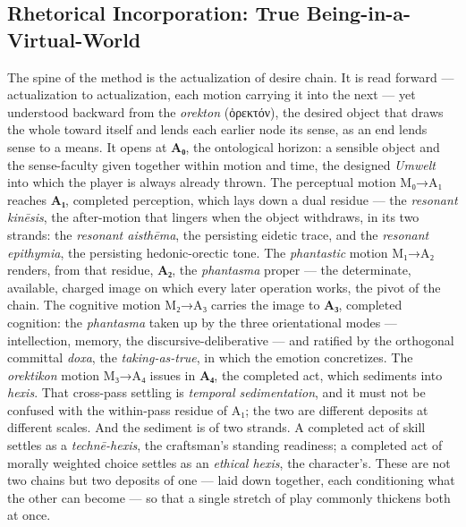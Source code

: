 \documentclass{article}
\newcommand{\gk}[1]{{\greekfont #1}}
\begin{document}
\subsection*{Rhetorical Incorporation: True Being-in-a-Virtual-World}

The spine of the method is the actualization of desire chain. It is read forward — actualization to actualization, each motion carrying it into the next — yet understood backward from the \textit{orekton} (\gk{ὀρεκτόν}), the desired object that draws the whole toward itself and lends each earlier node its sense, as an end lends sense to a means. It opens at \textbf{A₀}, the ontological horizon: a sensible object and the sense-faculty given together within motion and time, the designed \textit{Umwelt} into which the player is always already thrown. The perceptual motion M₀→A₁ reaches \textbf{A₁}, completed perception, which lays down a dual residue — the \textit{resonant kinēsis}, the after-motion that lingers when the object withdraws, in its two strands: the \textit{resonant aisthēma}, the persisting eidetic trace, and the \textit{resonant epithymia}, the persisting hedonic-orectic tone. The \textit{phantastic} motion M₁→A₂ renders, from that residue, \textbf{A₂}, the \textit{phantasma} proper — the determinate, available, charged image on which every later operation works, the pivot of the chain. The cognitive motion M₂→A₃ carries the image to \textbf{A₃}, completed cognition: the \textit{phantasma} taken up by the three orientational modes — intellection, memory, the discursive-deliberative — and ratified by the orthogonal committal \textit{doxa}, the \textit{taking-as-true}, in which the emotion concretizes. The \textit{orektikon} motion M₃→A₄ issues in \textbf{A₄}, the completed act, which sediments into \textit{hexis}. That cross-pass settling is \textit{temporal sedimentation}, and it must not be confused with the within-pass residue of A₁; the two are different deposits at different scales. And the sediment is of two strands. A completed act of skill settles as a \textit{technē-hexis}, the craftsman's standing readiness; a completed act of morally weighted choice settles as an \textit{ethical hexis}, the character's. These are not two chains but two deposits of one — laid down together, each conditioning what the other can become — so that a single stretch of play commonly thickens both at once.
\end{document}
